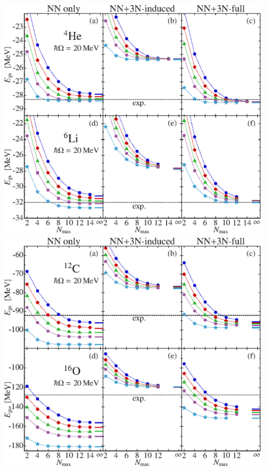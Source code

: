 \documentclass[accentcolor=tud2c,usenames,dvipsnames,colorbacktitle,inverttitle,landscape,german,presentation,t]{tudbeamer}
\begin{document}
\begin{frame}
\begin{columns}[c]
\begin{column}{0.5\textwidth}
\begin{center}
\begin{overprint}
            \includegraphics[width=\textwidth]{figures/03/roth1}
            \includegraphics[width=\textwidth]{figures/03/roth2}
          \end{overprint}
        \end{center}
      \end{column}
    \end{columns}
  \end{frame}
\end{document}
